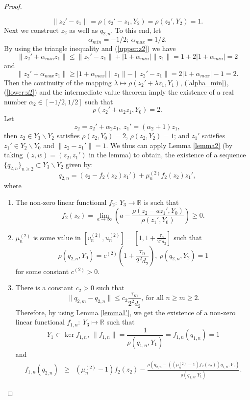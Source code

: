 \documentclass[10pt,a4paper]{amsart}
\begin{document}
\begin{proof}
\begin{itemize}
\begin{equation}
\label{upper:z2}
\|z_2'-z_1\|=\rho(z_2'-z_1,Y_2)=\rho(z_2',Y_2)=1.
\end{equation}
Next we construct $z_2$ as well as $q_{2,n}$. To this end, let
$$
\alpha_{min}=-1/2;~\alpha_{max}=1/2.
$$
By using the triangle inequality and (\ref{upper:z2}) we have
\begin{equation}
\label{alpha_min}
\|z_2'+\alpha_{min}z_1\|\le \|z_2'-z_1\|+|1+\alpha_{min}|\|z_1\|=1+2|1+\alpha_{min}|=2
\end{equation}
and
\begin{equation}
    \label{lower:z2}
    \|z_2'+\alpha_{max} z_1\|\ge|1+\alpha_{max}|\|z_1\|-\|z_2'-z_1\|=2|1+\alpha_{max}|-1=2.
    \end{equation}
Then the continuity of the mapping $\lambda\mapsto \rho(z_2'+\lambda z_1,Y_1)$,  (\ref{alpha_min}), (\ref{lower:z2}) and the intermediate value theorem imply the existence of a real number $\alpha_2\in[-1/2,1/2]$ such that
$$
\rho(z_2'+\alpha_2z_1,Y_0)=2.
$$
Let
$$
z_2=z_2'+\alpha_2z_1,~z_1'=(\alpha_2+1)z_1,
$$ then  $z_2\in Y_3\backslash Y_2$ satisfies $\rho(z_2,Y_0)=2$, $\rho(z_2,Y_2)=1$; and $z_1'$ satisfies $z_1'\in Y_2\backslash Y_0$ and $\|z_2-z_1'\|=1$. We thus can apply Lemma \ref{lemma2} (by taking $(z,w)=(z_2,z_1')$ in the lemma) to obtain, the existence of a sequence $\{q_{2,n}\}_{n\ge 2}\subset Y_{3}\backslash Y_2$ given by:
$$
q_{2,n}=(z_2-f_2(z_2)z_1')+\mu_n^{(2)}f_2(z_2)z_1',
$$
where
\renewcommand{\labelenumi}{\alph{enumi})}
\begin{enumerate}
    \item[(i)] The non-zero linear functional
     $f_2:~Y_3\rightarrow \mathbb R$ is such that 
     $$
     f_2(z_2)=\lim\limits_{a\to\infty}\left(a-\frac{\rho(z_2-az_1',Y_0)}{\rho(z_1',Y_0)}\right)\ge 0.
     $$
    \item[(ii)] $\mu_n^{(2)}$ is some value in $[v_n^{(2)},u_n^{(2)}]=\left[1,1+\frac{\tau_n}{2^2d_2}\right]$ such that
    $$
\rho(q_{2,n},Y_0)=c^{(2)}\left(1+\frac{\tau_n}{2^2d_2}\right),~\rho(q_{2,n},Y_2)=1
$$
for some constant $c^{(2)}>0$.
\item[(iii)] There is a constant $c_2>0$ such that
$$
\|q_{2,m}-q_{2,n}\|\le c_2\frac{\tau_m}{2^2d_2},~\mbox{for all $n\ge m\ge 2$}.
$$
Therefore, by using Lemma \ref{lemma1'},  we get the existence of a non-zero linear functional $f_{1,n}:~Y_{3}\longmapsto\mathbb R$ such that
$$
Y_1\subset \ker f_{1,n},~\|f_{1,n}\|=\frac{1}{\rho(q_{1,n},Y_1)}=f_{1,n}(q_{1,n})=1
$$
and
\begin{eqnarray*}
f_{1,n}(q_{2,n})&\ge&(\mu_n^{(2)}-1)f_2(z_2)-\frac{\rho\left(q_{2,n}-((\mu_n^{(2)}-1)f_2(z_2))q_{1,n},Y_1\right)}{\rho(q_{1,n},Y_1)}.

\end{eqnarray*}
\end{enumerate}
\end{itemize}
\end{proof}
\end{document}
